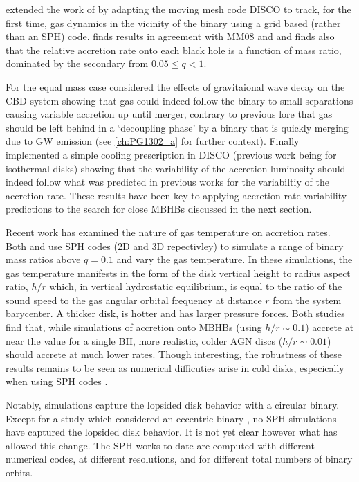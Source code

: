 \citep{Farris:2014} extended the work of \citep{DHM:2013:MNRAS} by adapting the
moving mesh code DISCO \citep{Duffell:2011:TESS,
DuffellMHDDISCO:2016} to track, for the first time, gas dynamics in the
vicinity of the binary using a grid based (rather than an SPH)
code. \citep{Farris:2014} finds results in agreement with MM08 and
\citep{DHM:2013:MNRAS} and finds also that the relative accretion rate onto
each black hole is a function of mass ratio, dominated by the secondary from
$0.05 \leq q < 1$. 


For the equal mass case \citep{Farris:2015:GW} considered the effects of
gravitaional wave decay on the CBD system showing that gas could indeed follow
the binary to small separations causing variable accretion up until merger,
contrary to previous lore that gas should be left behind in a `decoupling
phase' by a binary that is quickly merging due to GW emission (see
\ref{ch:PG1302_a} for further context). Finally \citep{Farris:2015:Cool}
implemented a simple cooling prescription in DISCO (previous work being for
isothermal disks) showing that the variability of the accretion luminosity
should indeed follow what was predicted in previous works for the variabiltiy
of the accretion rate. These results have been key to applying accretion rate
variability predictions to the search for close MBHBs discussed in the next
section.



Recent work has examined the nature of gas temperature on accretion rates.
Both \cite{YoungClarke:2015} and \cite{RagusaLodato:2016} use SPH codes (2D
and 3D repectivley) to simulate a range of binary mass ratios above $q=0.1$
and vary the gas temperature. In these simulations, the gas temperature
manifests in the form of the disk vertical height to radius aspect ratio,
$h/r$ which, in vertical hydrostatic equilibrium, is equal to the ratio of the
sound speed to the gas angular orbital frequency at distance $r$ from the
system barycenter. A thicker disk, is hotter and has larger pressure forces.
Both studies find that, while simulations of accretion onto MBHBs (using $h/r \sim
0.1$) accrete at near the value for a single BH, more realistic, colder AGN
discs ($h/r \sim 0.01$) should accrete at much lower rates. Though
interesting, the robustness of these results remains to be seen as numerical
difficuties arise in cold disks, especically when using SPH codes \citep{}.


Notably, \citep{RagusaLodato:2016} simulations capture the lopsided disk
behavior with a circular binary. Except for a study which considered an
eccentric binary \citep{Dunhill+2015}, no SPH simulations have captured the
lopsided disk behavior. It is not yet clear however what has allowed this
change. The SPH works to date are computed with different numerical codes, at
different resolutions, and for different total numbers of binary orbits.

